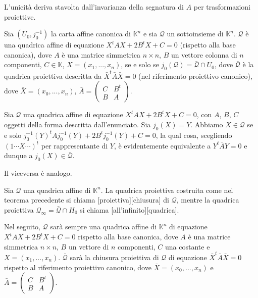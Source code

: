 	\par L'unicit\`a deriva stavolta dall'invarianza della segnatura di $A$ per trasformazioni proiettive. \EndProof
\begin{Theorem}\label{th66}
	Sia $(U_0,j_0^{-1})$ la carta affine canonica di $\mathbb{K}^n$ e sia $\mathcal{Q}$ un sottoinsieme di $\mathbb{K}^n$. $\mathcal{Q}$ \`e una quadrica affine di equazione $X^tAX + 2B^tX + C = 0$ (rispetto alla base canonica), dove $A$ \`e una matrice simmetrica $n \times n$, $B$ un vettore colonna di $n$ componenti, $C \in \mathbb{K}$, $X = (x_1, ..., x_n)$, se e solo se $j_0(\mathcal{Q}) = \bar{\mathcal{Q}} \cap U_0$, dove $\bar{\mathcal{Q}}$ \`e la quadrica proiettiva descritta da $\bar{X}^t\bar{A}\bar{X} = 0$ (nel riferimento proiettivo canonico), dove $\bar{X} = (x_0, ..., x_n)$, $\bar{A} = \left ( \begin{array}{c|c} C & B^t\\\hline B & A \end{array} \right )$.
\end{Theorem}
\Proof Sia $\mathcal{Q}$ una quadrica affine di equazione $X^tAX + 2 B^tX + C = 0$, con $A$, $B$, $C$ oggetti della forma descritta dall'enunciato. Sia $j_0(X) = Y$. Abbiamo $X \in \mathcal{Q}$ se e solo $j_0^{-1}(Y)^tAj_0^{-1}(Y) + 2 B^tj_0^{-1}(Y) + C = 0$, la qual cosa, scegliendo $(1 \cdots X \cdots)^t$ per rappresentante di $Y$, \`e evidentemente equivalente a $Y^t\bar{A}Y = 0$ e dunque a $j_0(X) \in \bar{\mathcal{Q}}$.
	\par Il viceversa \`e analogo. \EndProof
\begin{Definition}\label{def54}
	Sia $\mathcal{Q}$ una quadrica affine di $\mathbb{K}^n$. La quadrica proiettiva costruita come nel teorema precedente si chiama [proiettiva][chiusura] di $\mathcal{Q}$, mentre la quadrica proiettiva $\mathcal{Q}_\infty = \bar{\mathcal{Q}} \cap H_0$ si chiama [all'infinito][quadrica].
\end{Definition}
	\par Nel seguito, $\mathcal{Q}$ sar\`a sempre una quadrica affine di $\mathbb{K}^n$ di equazione $X^tAX + 2B^tX + C = 0$ rispetto alla base canonica, dove $A$ \`e una matrice simmetrica $n \times n$, $B$ un vettore di $n$ componenti, $C$ una costante e $X = (x_1, ..., x_n)$. $\bar{\mathcal{Q}}$ sar\`a la chiusura proiettiva di $\mathcal{Q}$ di equazione $\bar{X}^t\bar{A}\bar{X} = 0$ rispetto al riferimento proiettivo canonico, dove $\bar{X} = (x_0, ..., x_n)$ e $\bar{A} = \left ( \begin{array}{c|c} C & B^t\\\hline B & A \end{array} \right )$.
